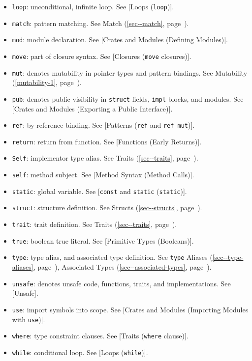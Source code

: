 \documentclass[a4paper,]{book}
\renewcommand*{\hyperlink}[2]{%
 #2 (\autoref{#1}, page~\pageref{#1})}
\begin{document}
\begin{itemize}
\item
  \texttt{loop}: unconditional, infinite loop. See {[}Loops
  (\texttt{loop}){]}.
\item
  \texttt{match}: pattern matching. See
  \protect\hyperlink{sec--match}{Match}.
\item
  \texttt{mod}: module declaration. See {[}Crates and Modules (Defining
  Modules){]}.
\item
  \texttt{move}: part of closure syntax. See {[}Closures (\texttt{move}
  closures){]}.
\item
  \texttt{mut}: denotes mutability in pointer types and pattern
  bindings. See \protect\hyperlink{mutability-1}{Mutability}.
\item
  \texttt{pub}: denotes public visibility in \texttt{struct} fields,
  \texttt{impl} blocks, and modules. See {[}Crates and Modules
  (Exporting a Public Interface){]}.
\item
  \texttt{ref}: by-reference binding. See {[}Patterns (\texttt{ref} and
  \texttt{ref\ mut}){]}.
\item
  \texttt{return}: return from function. See {[}Functions (Early
  Returns){]}.
\item
  \texttt{Self}: implementor type alias. See
  \protect\hyperlink{sec--traits}{Traits}.
\item
  \texttt{self}: method subject. See {[}Method Syntax (Method Calls){]}.
\item
  \texttt{static}: global variable. See {[}\texttt{const} and
  \texttt{static} (\texttt{static}){]}.
\item
  \texttt{struct}: structure definition. See
  \protect\hyperlink{sec--structs}{Structs}.
\item
  \texttt{trait}: trait definition. See
  \protect\hyperlink{sec--traits}{Traits}.
\item
  \texttt{true}: boolean true literal. See {[}Primitive Types
  (Booleans){]}.
\item
  \texttt{type}: type alias, and associated type definition. See
  \protect\hyperlink{sec--type-aliases}{\texttt{type} Aliases},
  \protect\hyperlink{sec--associated-types}{Associated Types}.
\item
  \texttt{unsafe}: denotes unsafe code, functions, traits, and
  implementations. See {[}Unsafe{]}.
\item
  \texttt{use}: import symbols into scope. See {[}Crates and Modules
  (Importing Modules with \texttt{use}){]}.
\item
  \texttt{where}: type constraint clauses. See {[}Traits (\texttt{where}
  clause){]}.
\item
  \texttt{while}: conditional loop. See {[}Loops (\texttt{while}){]}.
\end{itemize}
\end{document}
